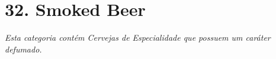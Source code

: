\section*{32. Smoked Beer}
\textit{Esta categoria contém Cervejas de Especialidade que possuem um caráter defumado.}
